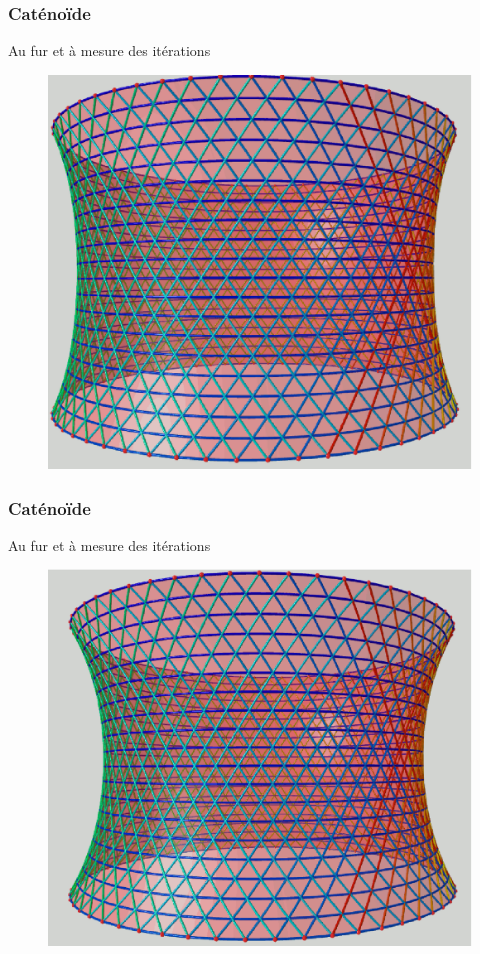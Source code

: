 \documentclass{beamer}
\begin{document}
\begin{frame}
\frametitle{Caténoïde}
Au fur et à mesure des itérations
\begin{figure}[h!]
      \centering 
      \includegraphics[scale=0.31]{catenoide/catenoide-3.eps}
\end{figure}
\end{frame}

\begin{frame}
\frametitle{Caténoïde}
Au fur et à mesure des itérations
\begin{figure}[h!]
      \centering 
      \includegraphics[scale=0.31]{catenoide/catenoide-4.eps}
\end{figure}
\end{frame}
\end{document}
